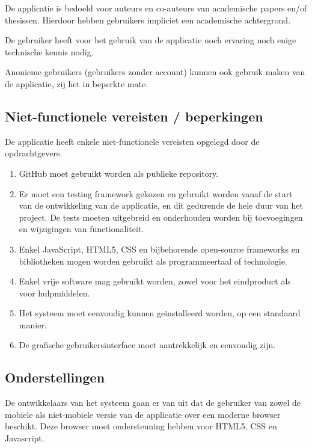De applicatie is bedoeld voor auteurs en co-auteurs van academische papers en/of thesissen. Hierdoor hebben gebruikers impliciet een academische achtergrond. 

De gebruiker heeft voor het gebruik van de applicatie noch ervaring noch enige technische kennis nodig.

Anonieme gebruikers (gebruikers zonder account) kunnen ook gebruik maken van de applicatie, zij het in beperkte mate. 

\subsection{Niet-functionele vereisten / beperkingen}

De applicatie heeft enkele niet-functionele vereisten opgelegd door de opdrachtgevers.
\begin{enumerate}
\item GitHub moet gebruikt worden als publieke repository.

\item Er moet een testing framework gekozen en gebruikt worden vanaf de start van de ontwikkeling van de applicatie, en dit gedurende de hele duur van het project. De tests moeten uitgebreid en onderhouden worden bij toevoegingen en wijzigingen van functionaliteit.

\item Enkel JavaScript, HTML5, CSS en bijbehorende open-source frameworks en bibliotheken mogen worden gebruikt als programmeertaal of technologie.

\item Enkel vrije software mag gebruikt worden, zowel voor het eindproduct als voor hulpmiddelen.

\item Het systeem moet eenvoudig kunnen geïnstalleerd worden, op een standaard manier.

\item De grafische gebruikersinterface moet aantrekkelijk en eenvoudig zijn.

\end{enumerate}

\subsection{Onderstellingen}

De ontwikkelaars van het systeem gaan er van uit dat de gebruiker van zowel de mobiele als niet-mobiele versie van de applicatie over een moderne browser beschikt. Deze browser moet ondersteuning hebben voor HTML5, CSS en Javascript. 